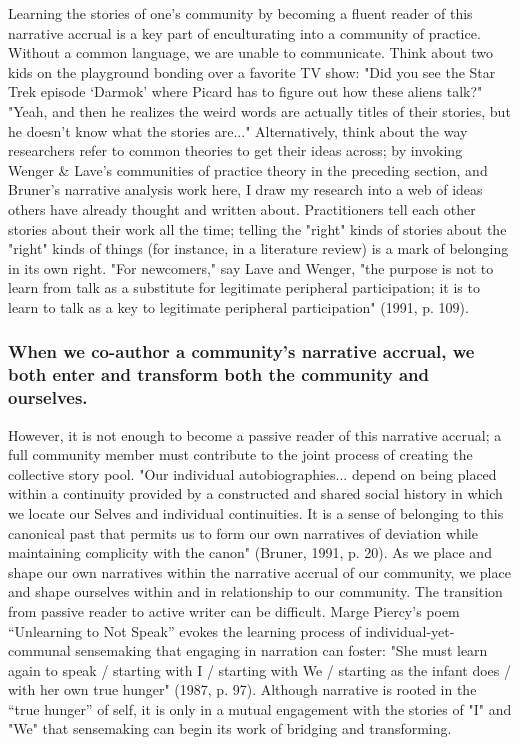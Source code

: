 Learning the stories of one's community by becoming a fluent reader of this narrative accrual is a key part of enculturating into a community of practice. Without a common language, we are unable to communicate. Think about two kids on the playground bonding over a favorite TV show: "Did you see the Star Trek episode ‘Darmok’ where Picard has to figure out how these aliens talk?" "Yeah, and then he realizes the weird words are actually titles of their stories, but he doesn’t know what the stories are..." Alternatively, think about the way researchers refer to common theories to get their ideas across; by invoking Wenger & Lave's communities of practice theory in the preceding section, and Bruner's narrative analysis work here, I draw my research into a web of ideas others have already thought and written about. Practitioners tell each other stories about their work all the time; telling the "right" kinds of stories about the "right" kinds of things (for instance, in a literature review) is a mark of belonging in its own right. "For newcomers," say Lave and Wenger, "the purpose is not to learn from talk as a substitute for legitimate peripheral participation; it is to learn to talk as a key to legitimate peripheral participation" (1991, p. 109).

\subsubsection{When we co-author a community’s narrative accrual, we both enter and transform both the community and ourselves.}

However, it is not enough to become a passive reader of this narrative accrual; a full community member must contribute to the joint process of creating the collective story pool. "Our individual autobiographies... depend on being placed within a continuity provided by a constructed and shared social history in which we locate our Selves and individual continuities. It is a sense of belonging to this canonical past that permits us to form our own narratives of deviation while maintaining complicity with the canon" (Bruner, 1991, p. 20). As we place and shape our own narratives within the narrative accrual of our community, we place and shape ourselves within and in relationship to our community. The transition from passive reader to active writer can be difficult. Marge Piercy’s poem “Unlearning to Not Speak” evokes the learning process of individual-yet-communal sensemaking that engaging in narration can foster: "She must learn again to speak / starting with I / starting with We / starting as the infant does / with her own true hunger" (1987, p. 97). Although narrative is rooted in the “true hunger” of self, it is only in a mutual engagement with the stories of "I" and "We" that sensemaking can begin its work of bridging and transforming.

